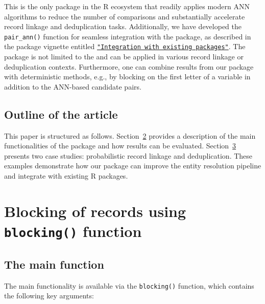 This is the only package in the R ecosystem that readily applies modern
ANN algorithms to reduce the number of comparisons and substantially
accelerate record linkage and deduplication tasks. Additionally, we have
developed the \texttt{pair\_ann()} function for seamless integration with the
 package, as described in the package vignette entitled
\href{https://cran.r-project.org/web/packages/blocking/vignettes/v3-integration.html}{\texttt{"Integration\ with\ existing\ packages"}}.
The  package is not limited to the
 and can be applied in various record linkage or
deduplication contexts. Furthermore, one can combine results from our package with deterministic methods, e.g., by blocking on the first letter of a variable in addition to the ANN-based candidate pairs.

\subsection{Outline of the article}\label{outline-of-the-article}

This paper is structured as follows. Section~\hyperref[sec-blocks]{2} provides a description of the main functionalities of the 
package and how results can be evaluated. Section~\hyperref[sec-case]{3}
presents two case studies: probabilistic record linkage and
deduplication. These examples demonstrate how our package can improve
the entity resolution pipeline and integrate with existing R packages.

\section{\texorpdfstring{Blocking of records using \texttt{blocking()} function}{Blocking of records using blocking() function}}\label{sec-blocks}

\subsection{The main function}\label{the-main-function}

The main functionality is available via the \texttt{blocking()} function, which
contains the following key arguments:


